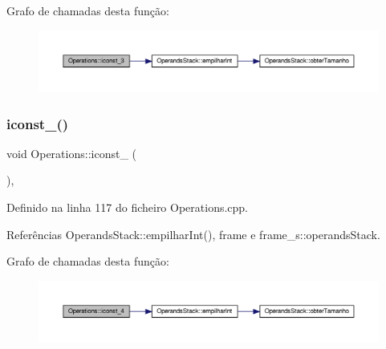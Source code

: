 Grafo de chamadas desta função\+:
\nopagebreak
\begin{figure}[H]
\begin{center}
\leavevmode
\includegraphics[width=350pt]{classOperations_ab8466864c000152e75172b623704f610_cgraph}
\end{center}
\end{figure}
\mbox{\label{classOperations_a5fad2dad3d79c889728a6687f36e1192}} 
\subsubsection{\texorpdfstring{iconst\+\_()}{iconst\_4()}}
{\footnotesize\ttfamily void Operations\+::iconst\+\_ (\begin{DoxyParamCaption}{ }\end{DoxyParamCaption})\hspace{0.3cm}{\ttfamily [static]}, {\ttfamily [private]}}



Definido na linha 117 do ficheiro Operations.\+cpp.



Referências Operands\+Stack\+::empilhar\+Int(), frame e frame\+\_\+s\+::operands\+Stack.

Grafo de chamadas desta função\+:
\nopagebreak
\begin{figure}[H]
\begin{center}
\leavevmode
\includegraphics[width=350pt]{classOperations_a5fad2dad3d79c889728a6687f36e1192_cgraph}
\end{center}
\end{figure}
\mbox{\label{classOperations_a87a4c7214825d084ded4a8ea50e4af7c}} 
